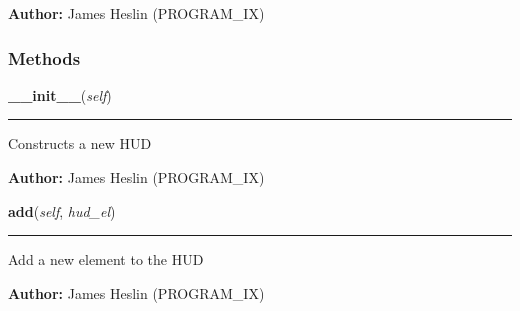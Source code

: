 \textbf{Author:} James Heslin (PROGRAM\_IX)





  \subsubsection{Methods}

    \label{pystroke:hud:HUD:__init__}

    \vspace{0.5ex}

\hspace{.8\funcindent}\begin{boxedminipage}{\funcwidth}

    \raggedright \textbf{\_\_init\_\_}(\textit{self})

    \vspace{-1.5ex}

    \rule{\textwidth}{0.5\fboxrule}
\setlength{\parskip}{2ex}
    Constructs a new HUD

\setlength{\parskip}{1ex}
\textbf{Author:} James Heslin (PROGRAM\_IX)



    \end{boxedminipage}

    \label{pystroke:hud:HUD:add}

    \vspace{0.5ex}

\hspace{.8\funcindent}\begin{boxedminipage}{\funcwidth}

    \raggedright \textbf{add}(\textit{self}, \textit{hud\_el})

    \vspace{-1.5ex}

    \rule{\textwidth}{0.5\fboxrule}
\setlength{\parskip}{2ex}
    Add a new element to the HUD

\setlength{\parskip}{1ex}
\textbf{Author:} James Heslin (PROGRAM\_IX)



    \end{boxedminipage}

